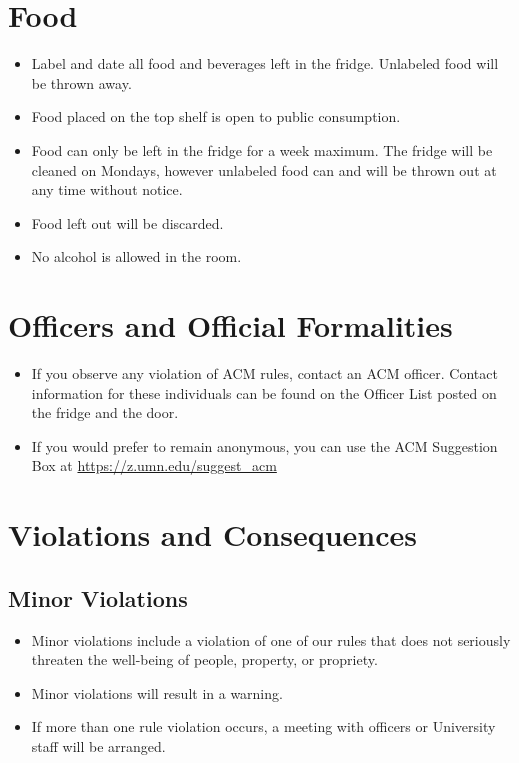 \section{Food}
\begin{itemize}
	\item Label and date all food and beverages left in the fridge. Unlabeled food will be thrown away.
	\item Food placed on the top shelf is open to public consumption.
	\item Food can only be left in the fridge for a week maximum. The fridge will be cleaned on Mondays, however unlabeled food can and will be thrown out at any time without notice.
	\item Food left out will be discarded.
	\item No alcohol is allowed in the room.
\end{itemize}

\section{Officers and Official Formalities}
\begin{itemize}
	\item If you observe any violation of ACM rules, contact an ACM officer. Contact information for these individuals can be found on the Officer List posted on the fridge and the door.
	\item If you would prefer to remain anonymous, you can use the ACM Suggestion Box at \url{https://z.umn.edu/suggest_acm}
\end{itemize}

\section{Violations and Consequences}
\subsection{Minor Violations}
\begin{itemize}
	\item Minor violations include a violation of one of our rules that does not seriously threaten the well-being of people, property, or propriety.
	\item Minor violations will result in a warning.
	\item If more than one rule violation occurs, a meeting with officers or University staff will be arranged.
\end{itemize}

